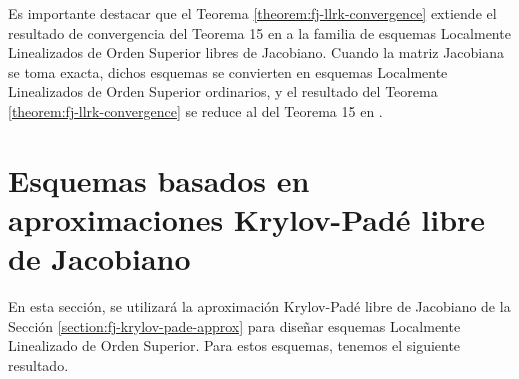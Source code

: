 Es importante destacar que el Teorema \ref{theorem:fj-llrk-convergence} extiende el resultado de convergencia del Teorema 15 en \cite{Jimenez13} a la familia de esquemas Localmente Linealizados de Orden Superior libres de Jacobiano. Cuando la matriz Jacobiana se toma exacta, dichos esquemas se convierten en esquemas  Localmente Linealizados de Orden Superior ordinarios, y el resultado del Teorema \ref{theorem:fj-llrk-convergence} se reduce al del Teorema 15 en \cite{Jimenez13}.

\section{Esquemas basados en aproximaciones Krylov-Padé libre de Jacobiano}\label{section:llrj-fj-1}
En esta sección, se utilizará la aproximación Krylov-Padé libre de Jacobiano de la Sección \ref{section:fj-krylov-pade-approx} para diseñar esquemas Localmente Linealizado de Orden Superior. Para estos esquemas, tenemos el siguiente resultado.

